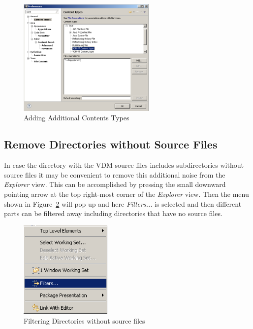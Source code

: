 \documentclass{overturerepchap}
\begin{document}
\begin{figure}[!htb]
\begin{center}
\includegraphics[width=0.6\textwidth]{screenDumps/contentstypes}
\caption{Adding Additional Contents Types\label{fig:ContentsTypes}}
\end{center}
\end{figure}

\subsection{Remove Directories without Source Files}

In case the directory with the VDM source files includes
subdirectories without source files it may be convenient to remove
this additional noise from the \emph{Explorer} view. This can be
accomplished by pressing the small downward pointing arrow at the top
right-most corner of the \emph{Explorer} view. Then the menu shown in
Figure~\ref{fig:filteringfiles} will pop up and here \emph{Filters...}
is selected and then different parts can be filtered away including
directories that have no source files.

\begin{figure}[!htb]
\begin{center}
\includegraphics[width=0.4\textwidth]{screenDumps/filteringfiles}
\caption{Filtering Directories without source files\label{fig:filteringfiles}}
\end{center}
\end{figure}
\end{document}
